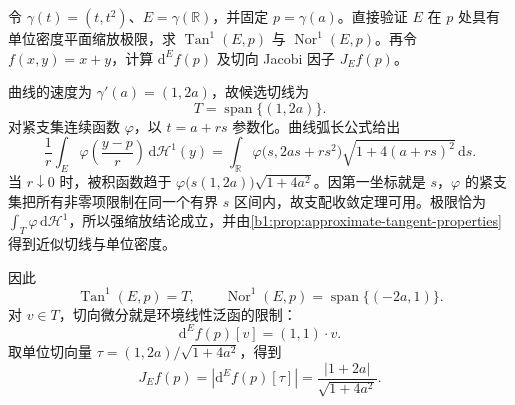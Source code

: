 \begin{exercise}\label{b1:ex:19-parabola-tangent-jacobian}
令 \(\gamma(t)=(t,t^2)\)、\(E=\gamma(\mathbb R)\)，并固定 \(p=\gamma(a)\)。直接验证 \(E\) 在 \(p\) 处具有单位密度平面缩放极限，求 \(\operatorname{Tan}^1(E,p)\) 与 \(\operatorname{Nor}^1(E,p)\)。再令 \(f(x,y)=x+y\)，计算 \(\mathrm{d}^Ef(p)\) 及切向 Jacobi 因子 \(J_Ef(p)\)。
\end{exercise}
\begin{solution}
曲线的速度为 \(\gamma'(a)=(1,2a)\)，故候选切线为
\[
 T=\operatorname{span}\{(1,2a)\}.
\]
对紧支集连续函数 \(\varphi\)，以 \(t=a+rs\) 参数化。曲线弧长公式给出
\[
 \frac1r\int_E\varphi\left(\frac{y-p}{r}\right)\,\mathrm d\mathcal H^1(y)
 =\int_{\mathbb R}
 \varphi\bigl(s,2as+rs^2\bigr)
 \sqrt{1+4(a+rs)^2}\,\mathrm ds.
\]
当 \(r\downarrow0\) 时，被积函数趋于
\(\varphi\bigl(s(1,2a)\bigr)\sqrt{1+4a^2}\)。因第一坐标就是 \(s\)，\(\varphi\) 的紧支集把所有非零项限制在同一个有界 \(s\) 区间内，故支配收敛定理可用。极限恰为 \(\int_T\varphi\,\mathrm d\mathcal H^1\)，所以强缩放结论成立，并由\cref{b1:prop:approximate-tangent-properties}得到近似切线与单位密度。

因此
\[
 \operatorname{Tan}^1(E,p)=T,
 \qquad
 \operatorname{Nor}^1(E,p)=\operatorname{span}\{(-2a,1)\}.
\]
对 \(v\in T\)，切向微分就是环境线性泛函的限制：
\[
 \mathrm{d}^Ef(p)[v]=(1,1)\cdot v.
\]
取单位切向量 \(\tau=(1,2a)/\sqrt{1+4a^2}\)，得到
\[
 J_Ef(p)=|\mathrm{d}^Ef(p)[\tau]|
 =\frac{|1+2a|}{\sqrt{1+4a^2}}.
\]
\end{solution}

